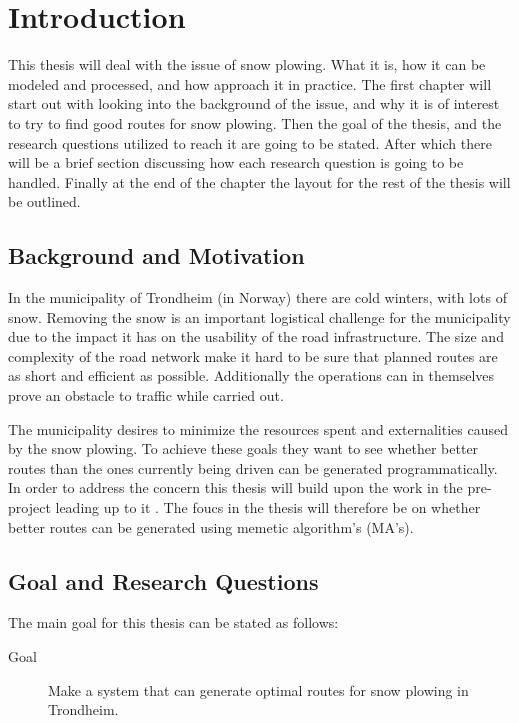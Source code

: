 \chapter{Introduction}
\label{cha:introduction}

This thesis will deal with the issue of snow plowing. What it is, how it can be modeled and processed, and how approach it in practice. The first chapter will start out with looking into the background of the issue, and why it is of interest to try to find good routes for snow plowing. Then the goal of the thesis, and the research questions utilized to reach it are going to be stated. After which there will be a brief section discussing how each research question is going to be handled. Finally at the end of the chapter the layout for the rest of the thesis will be outlined.

\section{Background and Motivation}

In the municipality of Trondheim (in Norway) there are cold winters, with lots of snow. Removing the snow is an important logistical challenge for the municipality due to the impact it has on the usability of the road infrastructure. The size and complexity of the road network make it hard to be sure that planned routes are as short and efficient as possible. Additionally the operations can in themselves prove an obstacle to traffic while carried out.

The municipality desires to minimize the resources spent and externalities caused by the snow plowing. To achieve these goals they want to see whether better routes than the ones currently being driven can be generated programmatically. In order to address the concern this thesis will build upon the work in the pre-project leading up to it \citep{forprosjektet}. The foucs in the thesis will therefore be on whether better routes can be generated using memetic algorithm's (MA's).

\section{Goal and Research Questions}
\label{sec:goal_and_research_questions}

The main goal for this thesis can be stated as follows:

\begin{description}
    \item [Goal] Make a system that can generate optimal routes for snow plowing in Trondheim.
\end{description}

